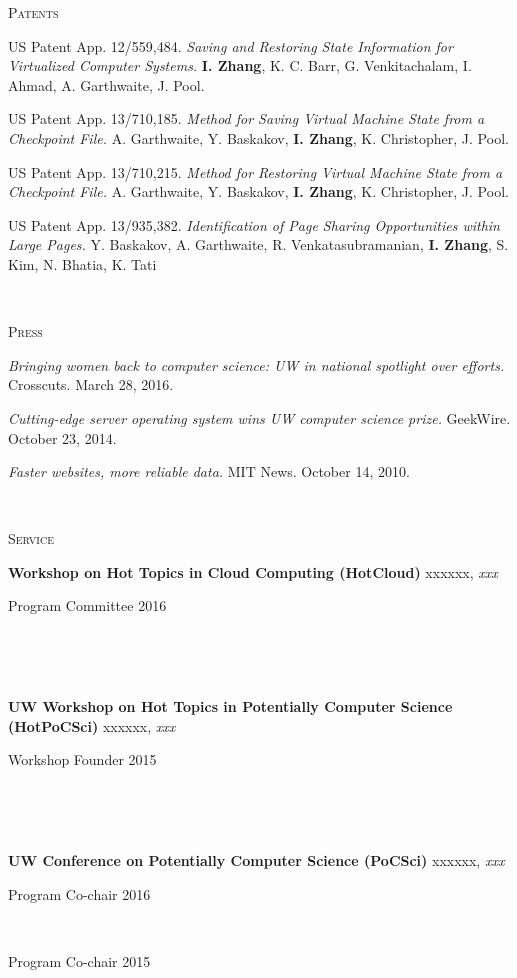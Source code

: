 \documentclass[10pt,times]{report}
\newlength{\sectiongap}
\newlength{\entrygap}
\newlength{\sectioncolwidth}
\newlength{\colgap}
\newlength{\stuffwidth}
\def\ifEqString#1#2{\def\testa{#1}\def\testb{#2}%
  \ifx\testa\testb}
\newenvironment{rtable}{
  \begin{minipage}{\textwidth}
  }{
  \end{minipage}
}
\newenvironment{rentry}[3][xxx]{
  \begin{minipage}[t]{\hsize}
    \textbf{#2}\ifEqString{#1}{xxx}\relax\else, \textit{#1}\fi
    \hspace{\stretch{1}} #3 \\
  }{
    \removelastskip
  \end{minipage}
  \\[\entrygap]  %
}
\newcommand{\rline}[2]{
  \begin{minipage}[t]{\hsize}
    #1 \hspace{\stretch{1}} #2
  \end{minipage} \\
}
\newenvironment{rsection}[1]{
  \begin{minipage}[t]{\sectioncolwidth}
    \textsc{#1}
  \end{minipage}
  \hspace{\colgap}
  \begin{minipage}[t]{\stuffwidth}
  }{
    \removelastskip
  \end{minipage}
  \\[\sectiongap]
}
\begin{document}
\begin{rtable}
  \begin{rsection}{Patents}
    US Patent App. 12/559,484.
    \textit{Saving and Restoring State Information for Virtualized
      Computer Systems.} 
    \textbf{I. Zhang}, K. C. Barr, G. Venkitachalam, I. Ahmad, A. Garthwaite, J. Pool.\\\vspace{-0.5em}

    US Patent App. 13/710,185. 
    \textit{Method for Saving Virtual Machine State from a Checkpoint
    File.}  A. Garthwaite, Y. Baskakov, \textbf{I. Zhang}, K. Christopher,
    J. Pool.\\\vspace{-0.5em}

    US Patent App. 13/710,215. \textit{Method for Restoring Virtual Machine State from a Checkpoint
    File.} A. Garthwaite, Y. Baskakov, \textbf{I. Zhang}, K. Christopher,
    J. Pool.\\\vspace{-0.5em}
    
    US Patent App. 13/935,382. \textit{Identification of Page Sharing Opportunities within Large Pages.} Y. Baskakov, A. Garthwaite, R. Venkatasubramanian, \textbf{I. Zhang}, S. Kim, N. Bhatia, K. Tati\\\vspace{-0.5em}
  \end{rsection}

  \begin{rsection}{Press}
    \textit{Bringing women back to computer science: UW in national
      spotlight over efforts.} Crosscuts. March 28, 2016.\\\vspace{-0.5em}

    \textit{Cutting-edge server operating system wins UW computer
      science prize.} GeekWire. October 23, 2014.\\\vspace{-0.5em}

    \textit{Faster websites, more reliable data.}
    MIT News. October 14, 2010.
  \end{rsection}

  \begin{rsection}{Service}
    \begin{rentry}{Workshop on Hot Topics in Cloud Computing (HotCloud)}{}
      \rline{Program Committee}{2016}
       \vspace{-0.5em}
    \end{rentry}
    \begin{rentry}{UW Workshop on Hot Topics in Potentially Computer
        Science (HotPoCSci)}{}
      \rline{Workshop Founder}{2015}
       \vspace{-0.5em}
    \end{rentry}
    \begin{rentry}{UW Conference on Potentially
        Computer Science (PoCSci)}{}
      \rline{Program Co-chair}{2016}
      \rline{Program Co-chair}{2015}
       \vspace{-0.5em}
    \end{rentry}


\end{rsection}
\end{rtable}
\end{document}
